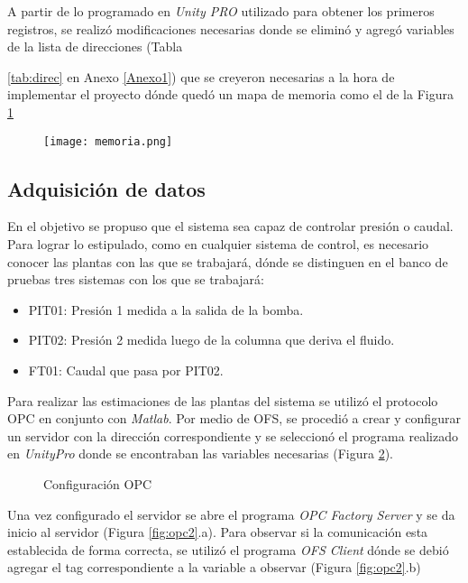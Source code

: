 
A partir de lo programado en \textit{Unity PRO} utilizado para obtener los primeros registros, se realizó modificaciones necesarias donde se eliminó y agregó variables de la lista de direcciones (Tabla {\ref{tab:direc} en Anexo \ref{Anexo1}) que se creyeron necesarias a la hora de implementar el proyecto dónde quedó un mapa de memoria como el de la Figura \ref{fig:memoria}
\begin{figure}[h!]
	\centering
	\texttt{[image: memoria.png]}
	\label{fig:memoria}
\end{figure}


\subsection{Adquisición de datos}
En el objetivo se propuso que el sistema sea capaz de controlar presión o caudal. Para lograr lo estipulado, como en cualquier sistema de control, es necesario conocer las plantas con las que se trabajará, dónde se distinguen en el banco de pruebas tres sistemas con los que se trabajará:
\begin{itemize}
	\item PIT01: Presión 1 medida a la salida de la bomba.
	\item PIT02: Presión 2 medida luego de la columna que deriva el fluido.
	\item FT01: Caudal que pasa por PIT02.
\end{itemize}
Para realizar las estimaciones de las plantas del sistema se utilizó el protocolo OPC en conjunto con \textit{Matlab}. Por medio de OFS, se procedió a crear y configurar un servidor con la dirección correspondiente y se seleccionó el programa realizado en \textit{UnityPro} donde se encontraban las variables necesarias (Figura \ref{fig:opc1}).

\begin{figure}[htbp]
	\centering
	\caption{Configuración OPC} \label{fig:opc1}
\end{figure}


Una vez configurado el servidor se abre el programa \textit{OPC Factory Server} y se da inicio al servidor (Figura \ref{fig:opc2}.a). Para observar si la comunicación esta establecida de forma correcta, se utilizó el programa \textit{OFS Client} dónde se debió agregar el tag correspondiente a la variable a observar (Figura \ref{fig:opc2}.b)

}
